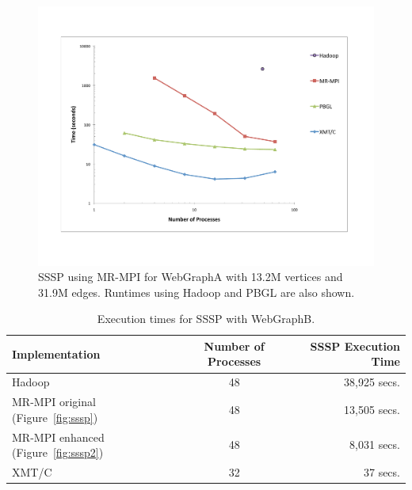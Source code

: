 \begin{figure}[htb]
\includegraphics[width=\textwidth]{fig_ssspA.pdf}
\caption{SSSP using MR-MPI for WebGraphA with
13.2M vertices and 31.9M edges.  Runtimes using Hadoop and PBGL
are also shown.}
\label{f:ssspA}
\end{figure}

\begin{table}
\begin{center}
\begin{tabular}{|l|c|r|}
\hline
Implementation & Number of Processes & SSSP Execution Time \\
\hline
Hadoop & 48  & 38,925 secs.\\
MR-MPI original (Figure~\ref{fig:sssp}) & 48 &  13,505 secs.\\
MR-MPI enhanced (Figure~\ref{fig:sssp2}) & 48 &  8,031 secs.\\
XMT/C  & 32 &  37 secs.\\
\hline
\end{tabular}
\caption{Execution times for SSSP with {WebGraphB}.}
\label{t:ssspB}
\end{center}
\end{table}



